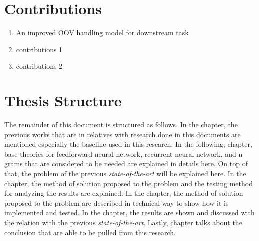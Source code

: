 \section{Contributions}
    \begin{enumerate}
        \item An improved OOV handling model for downstream task
        \item contributions 1
        \item contributions 2
    \end{enumerate}

\section{Thesis Structure}
    The remainder of this document is structured as follows. In the
     chapter, the previous works that are in
    relatives with research done in this documents are mentioned
    especially the baseline used in this research. In the following,
     chapter, base theories for
    feedforward neural network, recurrent neural network, and n-grams
    that are considered to be needed are explained in details here. On
    top of that, the problem of the previous \textit{state-of-the-art}
    will be explained here. In the  chapter, the
    method of solution proposed to the problem and the testing method
    for analyzing the results are explained. In the
     chapter, the method of solution
    proposed to the problem are described in technical way to show how
    it is implemented and tested. In the 
    chapter, the results are shown and discussed with the relation
    with the previous \textit{state-of-the-art}. Lastly,
     chapter talks about the conclusion that are
    able to be pulled from this research.





